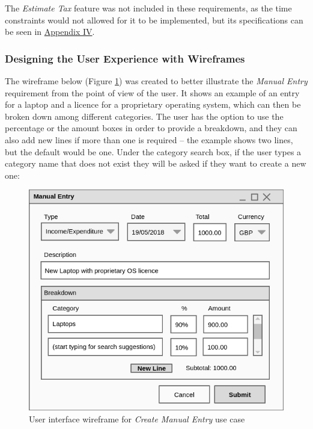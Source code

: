 The \emph{Estimate Tax} feature  was not included in these requirements, as the
time constraints would not allowed for it to be implemented, but its
specifications can be seen in \hyperref[appendix4]{Appendix IV}.

\subsubsection{Designing the User Experience with Wireframes}
The wireframe below (Figure \ref{fig:Wireframe.CreateManualEntry}) was created
to better illustrate the \emph{Manual Entry} requirement from the point of view
of the user. It shows an example of an entry for a laptop and a licence for a
proprietary operating system, which can then be broken down among different
categories. The user has the option to use the percentage or the amount boxes
in order to provide a breakdown, and they can also add new lines if more than
one is required -- the example shows two lines, but the default would be one.
Under the category search box, if the user types a category name that does not
exist they will be asked if they want to create a new one:
\begin{figure}[ht!]
  \begin{center}
    \includegraphics[width=14cm]{./contents/img/Wireframe_-_Manual_Entry.png}
  \end{center}
  \caption{User interface wireframe for \emph{Create Manual Entry} use case}
  \label{fig:Wireframe.CreateManualEntry}
\end{figure}
\FloatBarrier

